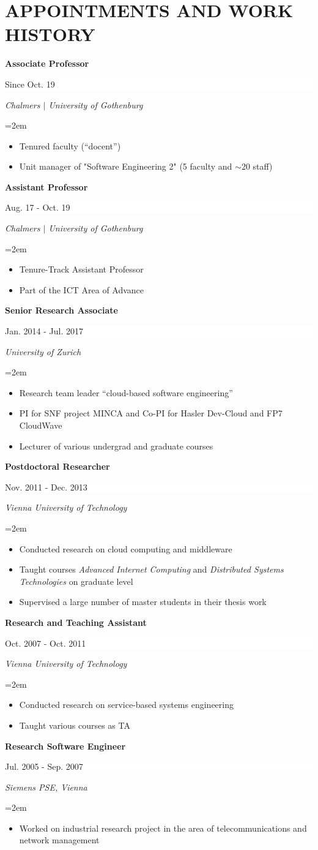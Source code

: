 \documentclass[paper=letter,fontsize=11pt]{scrartcl} %
\newcommand{\sepspace}{\vspace*{1em}}		%
\newcommand{\NewPart}[2]{\section*{\uppercase{#1} #2}}
\newcommand{\EducationEntry}[4]{
		\noindent \textbf{#1} \hfill      %
		\colorbox{White}{%
			\parbox{10em}{%
			\hfill\color{Black}#2}} \par  %
		\noindent \textit{#3} \par        %
		\noindent\hangindent=2em\hangafter=0 \small #4 %
		\normalsize \par}
\begin{document}
\NewPart{Appointments and Work History}{}

\EducationEntry{Associate Professor}{Since Oct. 19}{Chalmers $|$ University of Gothenburg}{\begin{itemize}
\item{Tenured faculty  (``docent'')}
\item{Unit manager of "Software Engineering 2" (5 faculty and $\sim$20 staff)}
\end{itemize}
}
\sepspace
\EducationEntry{Assistant Professor}{Aug. 17 - Oct. 19}{Chalmers $|$ University of Gothenburg}{\begin{itemize}
\item{Tenure-Track Assistant Professor}
\item{Part of the ICT Area of Advance}
\end{itemize}
}
\sepspace
\EducationEntry{Senior Research Associate}{Jan. 2014 - Jul. 2017}{University of
Zurich}{\begin{itemize}
\item{Research team leader ``cloud-based software engineering''}
\item{PI for SNF project MINCA and Co-PI for Hasler Dev-Cloud and FP7 CloudWave}
\item{Lecturer of various undergrad and graduate courses}
\end{itemize}
}
\sepspace
\EducationEntry{Postdoctoral Researcher}{Nov. 2011 - Dec. 2013}{Vienna
University of Technology}{\begin{itemize}
\item{Conducted research on cloud computing and middleware}
\item{Taught courses \emph{Advanced Internet Computing} and \emph{Distributed Systems Technologies} on graduate level}
\item{Supervised a large number of master students in their thesis work}
\end{itemize}}
\sepspace
\EducationEntry{Research and Teaching Assistant}{Oct. 2007 - Oct. 2011}{Vienna
University of Technology} {\begin{itemize}\item{Conducted research on service-based systems engineering}
\item{Taught various courses as TA}
\end{itemize}}
\EducationEntry{Research Software Engineer}{Jul. 2005 - Sep. 2007}{Siemens PSE,
Vienna}{ {\begin{itemize}\item{Worked on industrial research project in the area of telecommunications and network management}
\end{itemize}}
}
\end{document}
